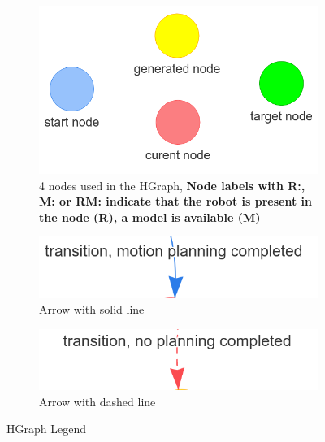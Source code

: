 \begin{figure}[H]
     \centering
     \begin{subfigure}[b]{0.5\textwidth}
         \centering
         \includegraphics[width=\textwidth]{figures/hgraph_legend_nodes.png}
         \caption{4 nodes used in the HGraph, \textbf{\large Node labels with R:, M: or RM: indicate that the robot is present in the node (R), a model is available (M)}}
     \end{subfigure}
     
     \begin{subfigure}[b]{0.49\textwidth}
         \centering
         \includegraphics[width=\textwidth]{figures/hgraph_legend_transition1.png}
         \caption{Arrow with solid line}
     \end{subfigure}
    \hfill 
    \begin{subfigure}[b]{0.49\textwidth}
         \centering
         \includegraphics[width=\textwidth]{figures/hgraph_legend_transition2.png}
         \caption{Arrow with dashed line}
     \end{subfigure}
   \caption{HGraph Legend}
    \label{figure: hgraph_legend2}
\end{figure}


